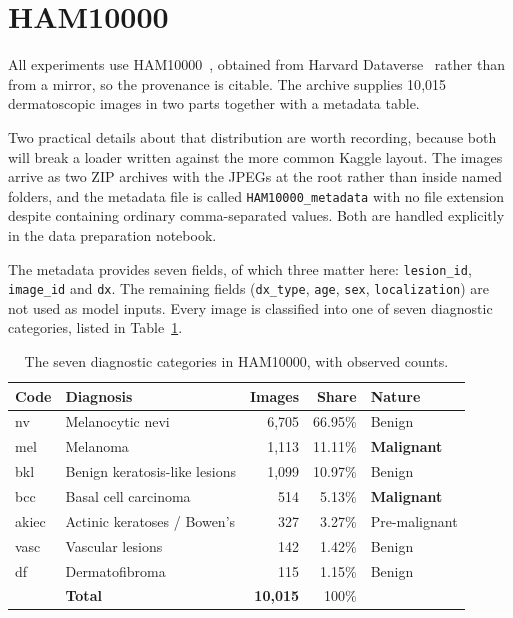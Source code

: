 \section{HAM10000}
\label{sec:data-ham}

All experiments use HAM10000~\cite{tschandl2018ham10000}, obtained from Harvard
Dataverse~\cite{tschandl2018ham10000_dataverse} rather than from a mirror, so the
provenance is citable. The archive supplies 10{,}015 dermatoscopic images in two parts
together with a metadata table.

Two practical details about that distribution are worth recording, because both will
break a loader written against the more common Kaggle layout. The images arrive as two
ZIP archives with the JPEGs at the root rather than inside named folders, and the
metadata file is called \texttt{HAM10000\_metadata} with no file extension despite
containing ordinary comma-separated values. Both are handled explicitly in the data
preparation notebook.

The metadata provides seven fields, of which three matter here: \texttt{lesion\_id},
\texttt{image\_id} and \texttt{dx}. The remaining fields (\texttt{dx\_type},
\texttt{age}, \texttt{sex}, \texttt{localization}) are not used as model inputs. Every
image is classified into one of seven diagnostic categories, listed in
Table~\ref{tab:classes}.

\begin{table}[htbp]
\centering
\caption{The seven diagnostic categories in HAM10000, with observed counts.}
\label{tab:classes}
\small
\begin{tabular}{@{}llrrl@{}}
\toprule
\textbf{Code} & \textbf{Diagnosis} & \textbf{Images} & \textbf{Share} & \textbf{Nature} \\
\midrule
nv    & Melanocytic nevi                  & 6{,}705 & 66.95\% & Benign \\
mel   & Melanoma                          & 1{,}113 & 11.11\% & \textbf{Malignant} \\
bkl   & Benign keratosis-like lesions     & 1{,}099 & 10.97\% & Benign \\
bcc   & Basal cell carcinoma              &    514 &  5.13\% & \textbf{Malignant} \\
akiec & Actinic keratoses / Bowen's       &    327 &  3.27\% & Pre-malignant \\
vasc  & Vascular lesions                  &    142 &  1.42\% & Benign \\
df    & Dermatofibroma                    &    115 &  1.15\% & Benign \\
\midrule
      & \textbf{Total}                    & \textbf{10{,}015} & 100\% & \\
\bottomrule
\end{tabular}
\end{table}

